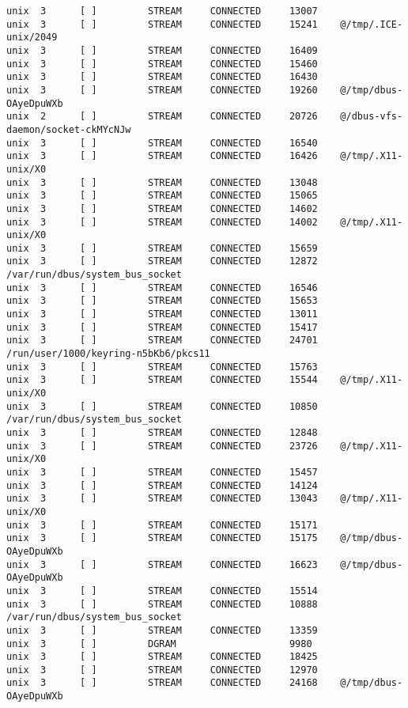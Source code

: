 \begin{lstlisting}
unix  3      [ ]         STREAM     CONNECTED     13007    
unix  3      [ ]         STREAM     CONNECTED     15241    @/tmp/.ICE-unix/2049
unix  3      [ ]         STREAM     CONNECTED     16409    
unix  3      [ ]         STREAM     CONNECTED     15460    
unix  3      [ ]         STREAM     CONNECTED     16430    
unix  3      [ ]         STREAM     CONNECTED     19260    @/tmp/dbus-OAyeDpuWXb
unix  2      [ ]         STREAM     CONNECTED     20726    @/dbus-vfs-daemon/socket-ckMYcNJw
unix  3      [ ]         STREAM     CONNECTED     16540    
unix  3      [ ]         STREAM     CONNECTED     16426    @/tmp/.X11-unix/X0
unix  3      [ ]         STREAM     CONNECTED     13048    
unix  3      [ ]         STREAM     CONNECTED     15065    
unix  3      [ ]         STREAM     CONNECTED     14602    
unix  3      [ ]         STREAM     CONNECTED     14002    @/tmp/.X11-unix/X0
unix  3      [ ]         STREAM     CONNECTED     15659    
unix  3      [ ]         STREAM     CONNECTED     12872    /var/run/dbus/system_bus_socket
unix  3      [ ]         STREAM     CONNECTED     16546    
unix  3      [ ]         STREAM     CONNECTED     15653    
unix  3      [ ]         STREAM     CONNECTED     13011    
unix  3      [ ]         STREAM     CONNECTED     15417    
unix  3      [ ]         STREAM     CONNECTED     24701    /run/user/1000/keyring-n5bKb6/pkcs11
unix  3      [ ]         STREAM     CONNECTED     15763    
unix  3      [ ]         STREAM     CONNECTED     15544    @/tmp/.X11-unix/X0
unix  3      [ ]         STREAM     CONNECTED     10850    /var/run/dbus/system_bus_socket
unix  3      [ ]         STREAM     CONNECTED     12848    
unix  3      [ ]         STREAM     CONNECTED     23726    @/tmp/.X11-unix/X0
unix  3      [ ]         STREAM     CONNECTED     15457    
unix  3      [ ]         STREAM     CONNECTED     14124    
unix  3      [ ]         STREAM     CONNECTED     13043    @/tmp/.X11-unix/X0
unix  3      [ ]         STREAM     CONNECTED     15171    
unix  3      [ ]         STREAM     CONNECTED     15175    @/tmp/dbus-OAyeDpuWXb
unix  3      [ ]         STREAM     CONNECTED     16623    @/tmp/dbus-OAyeDpuWXb
unix  3      [ ]         STREAM     CONNECTED     15514    
unix  3      [ ]         STREAM     CONNECTED     10888    /var/run/dbus/system_bus_socket
unix  3      [ ]         STREAM     CONNECTED     13359    
unix  3      [ ]         DGRAM                    9980     
unix  3      [ ]         STREAM     CONNECTED     18425    
unix  3      [ ]         STREAM     CONNECTED     12970    
unix  3      [ ]         STREAM     CONNECTED     24168    @/tmp/dbus-OAyeDpuWXb

\end{lstlisting}
